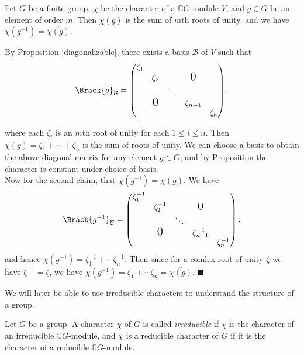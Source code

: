 \documentclass[../Project.tex]{subfiles}
\begin{document}
\begin{prop}[{\cite[Proposition 13.9 (2),(3)]{2}}]
	\label{inverseisconj}
	Let $G$ be a finite group, $\chi$ be the character of a $\mathbb{C}G$-module $V$, and $g \in G$ be an element of order $m$. Then $\chi(g)$ is the sum of $m$th roots of unity, and we have $\chi(g^{-1}) = \overline{\chi(g)}$.
\end{prop}
\begin{proo*}[{\cite[Proposition 13.9 (2),(3)]{2}}]
	By Proposition \ref{diagonalizable}, there exists a basis $\mathcal{B}$ of $V$ such that
	$$\Brack{g}_\mathcal{B} = 
 \begin{pmatrix}
	\zeta_1 &  & &  & \\
	 & \zeta_2 & & \text{\Large{0}}&  \\
	& & \ddots & & \\
	 & \text{\Large{0}} & & \zeta_{n-1} & \\ 
	&  & & & \zeta_n\end{pmatrix}.$$

	where each $\zeta_i$ is an $m$th root of unity for each $1 \leqslant i \leqslant n$. Then $\chi(g) = \zeta_1 + \cdots + \zeta_n$ is the sum of roots of unity. We can choose a basis to obtain the above diagonal matrix for any element $g \in G$, and by Proposition \label{mehbasisch} the character is constant under choice of basis.\\


	Now for the second claim, that $\chi(g^{-1}) = \overline{\chi(g)}$. We have
	$$\Brack{g^{-1}}_\mathcal{B} = \begin{pmatrix}
	\zeta_1^{-1} &  & &  & \\
	 & \zeta_2^{-1} & & \text{\Large{0}}&  \\
	& & \ddots & & \\
	 & \text{\Large{0}} & & \zeta_{n-1}^{-1} & \\ 
	&  & & & \zeta_n^{-1}\end{pmatrix},$$
	and hence $\chi(g^{-1}) = \zeta_1^{-1} + \cdots \zeta_n^{-1}$. Then since for a comlex root of unity $\zeta$ we have
	$\zeta^{-1} = \overline{\zeta}$, we have $\chi(g^{-1}) = \overline{\zeta_1} + \cdots \overline{\zeta_n} =  \overline{\chi(g)}$. \hfill$\blacksquare$\\
\end{proo*}

We will later be able to use irreducible characters to understand the structure of a group.

\begin{defi}
	 Let $G$ be a group. A character $\chi$ of $G$ is called \textit{irreducible} if $\chi$ is the character of an irreducible $\mathbb{C}G$-module, and $\chi$ is a reducible character of $G$ if it is the character of a reducible $\mathbb{C}G$-module.
\end{defi}
\end{document}
